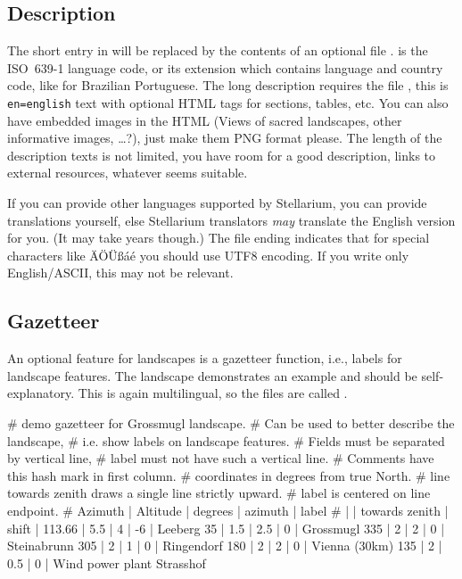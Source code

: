 \subsection{Description}
\label{sec:landscapes:Description}

The short  entry in  will be
replaced by the contents of an optional file
.  is the ISO~639-1
language code, or its extension which contains language and country
code, like  for Brazilian Portuguese. The long
description requires the file , this is
\texttt{en=english} text with optional HTML tags for sections, tables,
etc. You can also have embedded images in the HTML (Views of sacred
landscapes, other informative images, \ldots?), just make them PNG
format please. The length of the description texts is not limited, you
have room for a good description, links to external resources,
whatever seems suitable.

If you can provide other languages supported by Stellarium, you can
provide translations yourself, else Stellarium translators \emph{may}
translate the English version for you. (It may take years though.) The file
ending  indicates that for special characters like ÄÖÜßáé
you should use UTF8 encoding. If you write only English/ASCII, this may not
be relevant.



\subsection{Gazetteer}
\label{sec:landscapes:Gazetteer}

An optional feature for landscapes is a gazetteer function, i.e., labels for
landscape features. The  landscape demonstrates
an example and should be self-explanatory. This is again multilingual,
so the files are called .

\begin{configfileScr}
# demo gazetteer for Grossmugl landscape.
# Can be used to better describe the landscape,
# i.e. show labels on landscape features.
# Fields must be separated by vertical line,
# label must not have such a vertical line.
# Comments have this hash mark in first column.
# coordinates in degrees from true North.
# line towards zenith draws a single line strictly upward.
# label is centered on line endpoint.
# Azimuth | Altitude | degrees        | azimuth | label
#         |          | towards zenith |  shift  |
113.66    | 5.5      |     4          |   -6    | Leeberg
35        | 1.5      |     2.5        |    0    | Grossmugl
335       | 2        |     2          |    0    | Steinabrunn
305       | 2        |     1          |    0    | Ringendorf
180       | 2        |     2          |    0    | Vienna (30km)
135       | 2        |     0.5        |    0    | Wind power plant Strasshof
\end{configfileScr}

